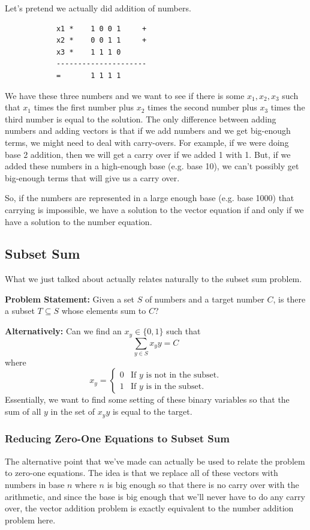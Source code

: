 \documentclass[letterpaper]{article}
\begin{document}
\bigskip 

Let's pretend we actually did addition of numbers. 
\begin{verbatim}
            x1 *    1 0 0 1     +
            x2 *    0 0 1 1     + 
            x3 *    1 1 1 0
            ---------------------
            =       1 1 1 1
\end{verbatim}
We have these three numbers and we want to see if there is some $x_1, x_2, x_3$ such that $x_1$ times the first number plus $x_2$ times the second number plus $x_3$ times the third number is equal to the solution. The only difference between adding numbers and adding vectors is that if we add numbers and we get big-enough terms, we might need to deal with carry-overs. For example, if we were doing base 2 addition, then we will get a carry over if we added 1 with 1. But, if we added these numbers in a high-enough base (e.g. base 10), we can't possibly get big-enough terms that will give us a carry over.

\bigskip 

So, if the numbers are represented in a large enough base (e.g. base 1000) that carrying is impossible, we have a solution to the vector equation if and only if we have a solution to the number equation. 


\subsection{Subset Sum}
What we just talked about actually relates naturally to the subset sum problem. 

\bigskip 

\textbf{Problem Statement:} Given a set $S$ of numbers and a target number $C$, is there a subset $T \subseteq S$ whose elements sum to $C$? 

\bigskip 

\textbf{Alternatively:} Can we find an $x_y \in \{0, 1\}$ such that 
\[\sum_{y \in S} x_y y = C\]
where
\[x_y = \begin{cases}
    0 & \text{If } y \text{ is not in the subset.} \\ 
    1 & \text{If } y \text{ is in the subset.} 
\end{cases}\]
Essentially, we want to find some setting of these binary variables so that the sum of all $y$ in the set of $x_y y$ is equal to the target. 

\subsubsection{Reducing Zero-One Equations to Subset Sum}
The alternative point that we've made can actually be used to relate the problem to zero-one equations. The idea is that we replace all of these vectors with numbers in base $n$ where $n$ is big enough so that there is no carry over with the arithmetic, and since the base is big enough that we'll never have to do any carry over, the vector addition problem is exactly equivalent to the number addition problem here. 
\end{document}
